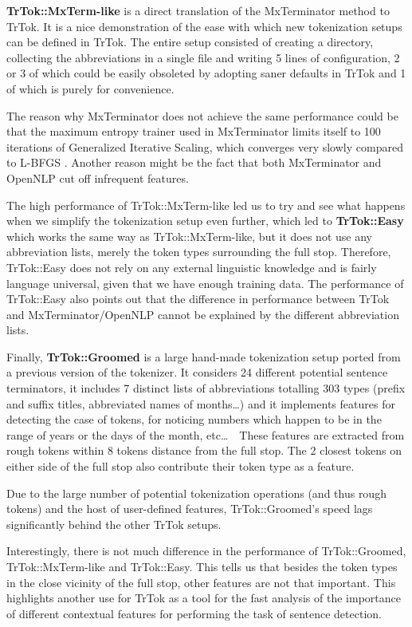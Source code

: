 \textbf{TrTok::MxTerm-like} is a direct translation of the
MxTerminator method to TrTok. It is a nice demonstration of the ease
with which new tokenization setups can be defined in TrTok. The entire
setup consisted of creating a directory, collecting the abbreviations
in a single file and writing 5 lines of configuration, 2 or 3 of which
could be easily obsoleted by adopting saner defaults in TrTok and 1 of
which is purely for convenience.

The reason why MxTerminator does not achieve the same performance
could be that the maximum entropy trainer used in MxTerminator limits
itself to 100 iterations of Generalized Iterative Scaling, which
converges very slowly compared to L-BFGS \cite{maxent-algorithms}.
Another reason might be the fact that both MxTerminator and OpenNLP
cut off infrequent features.

The high performance of TrTok::MxTerm-like led us to try and see what
happens when we simplify the tokenization setup even further, which
led to \textbf{TrTok::Easy} which works the same way as
TrTok::MxTerm-like, but it does not use any abbreviation lists, merely
the token types surrounding the full stop. Therefore, TrTok::Easy does
not rely on any external linguistic knowledge and is fairly language
universal, given that we have enough training data. The performance of
TrTok::Easy also points out that the difference in performance between
TrTok and MxTerminator/OpenNLP cannot be explained by the different
abbreviation lists.

Finally, \textbf{TrTok::Groomed} is a large hand-made
tokenization setup ported from a previous version of the tokenizer. It
considers 24 different potential sentence terminators, it includes 7
distinct lists of abbreviations totalling 303 types (prefix and suffix
titles, abbreviated names of months\ldots) and it implements features
for detecting the case of tokens, for noticing numbers which happen to
be in the range of years or the days of the month, etc\ldots\ \ These
features are extracted from rough tokens within 8 tokens distance from
the full stop. The 2 closest tokens on either side of the full stop
also contribute their token type as a feature.

Due to the large number of potential tokenization operations (and thus
rough tokens) and the host of user-defined features, TrTok::Groomed's
speed lags significantly behind the other TrTok setups.

Interestingly, there is not much difference in the performance of
TrTok::Groomed, TrTok::MxTerm-like and TrTok::Easy. This tells us that
besides the token types in the close vicinity of the full stop, other
features are not that important. This highlights another use for TrTok
as a tool for the fast analysis of the importance of different
contextual features for performing the task of sentence detection.

